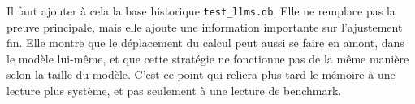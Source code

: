 Il faut ajouter \`a cela la base historique \texttt{test\_llms.db}. Elle ne remplace pas la preuve principale, mais elle ajoute une information importante sur l'ajustement fin. Elle montre que le d\'eplacement du calcul peut aussi se faire en amont, dans le mod\`ele lui-m\^eme, et que cette strat\'egie ne fonctionne pas de la m\^eme mani\`ere selon la taille du mod\`ele. C'est ce point qui reliera plus tard le m\'emoire \`a une lecture plus syst\`eme, et pas seulement \`a une lecture de benchmark.
